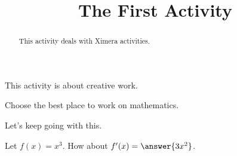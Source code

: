\documentclass{ximera}
\title{The First Activity}
\begin{document}
  
\begin{abstract}  
This activity deals with Ximera activities.  
\end{abstract}  
\maketitle
This activity is about creative work.  
\begin{exercise}  
  Choose the best place to work on mathematics.  
  \begin{multipleChoice}  
  \end{multipleChoice}  
\end{exercise}

Let's keep going with this.

\begin{exercise}
  Let \(f(x) = x^3\). How about \(f'(x) = \answer{3x^2}\).
\end{exercise}
\end{document}
